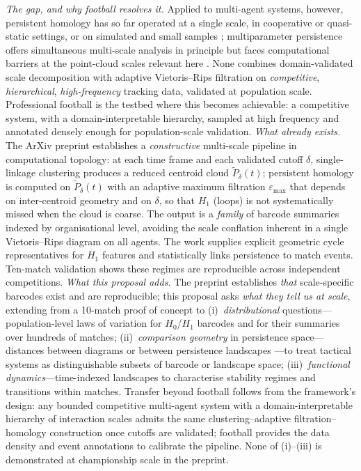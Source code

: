 \textit{The gap, and why football resolves it.} Applied to multi-agent systems, however, persistent homology has so far operated at a single scale, in cooperative or quasi-static settings, or on simulated and small samples \citep{Gu2022, SchindlerBarahona2023}; multiparameter persistence offers simultaneous multi-scale analysis in principle but faces computational barriers at the point-cloud scales relevant here \citep{BotnanLesnick2022}. None combines domain-validated scale decomposition with adaptive Vietoris--Rips filtration on \emph{competitive}, \emph{hierarchical}, \emph{high-frequency} tracking data, validated at population scale. Professional football is the testbed where this becomes achievable: a competitive system, with a domain-interpretable hierarchy, sampled at high frequency and annotated densely enough for population-scale validation.
\textit{What already exists.} The ArXiv preprint \citep{Brown2026} establishes a \emph{constructive} multi-scale pipeline in computational topology: at each time frame and each validated cutoff $\delta$, single-linkage clustering produces a reduced centroid cloud $\tilde P_\delta(t)$; persistent homology is computed on $\tilde P_\delta(t)$ with an adaptive maximum filtration $\varepsilon_{\max}$ that depends on inter-centroid geometry and on $\delta$, so that $H_1$ (loops) is not systematically missed when the cloud is coarse. The output is a \emph{family} of barcode summaries indexed by organisational level, avoiding the scale conflation inherent in a single Vietoris--Rips diagram on all agents. The work supplies explicit geometric cycle representatives for $H_1$ features and statistically links persistence to match events. Ten-match validation shows these regimes are reproducible across independent competitions.
\textit{What this proposal adds.} The preprint establishes \emph{that} scale-specific barcodes exist and are reproducible; this proposal asks \emph{what they tell us at scale}, extending from a 10-match proof of concept to (i)~\emph{distributional} questions---population-level laws of variation for $H_0$/$H_1$ barcodes and for their summaries over hundreds of matches; (ii)~\emph{comparison geometry} in persistence space---distances between diagrams or between persistence landscapes \citep{Bubenik2015, Chazal2014}---to treat tactical systems as distinguishable subsets of barcode or landscape space; (iii)~\emph{functional dynamics}---time-indexed landscapes to characterise stability regimes and transitions within matches. Transfer beyond football follows from the framework's design: any bounded competitive multi-agent system with a domain-interpretable hierarchy of interaction scales admits the same clustering--adaptive filtration--homology construction once cutoffs are validated; football provides the data density and event annotations to calibrate the pipeline. None of (i)--(iii) is demonstrated at championship scale in the preprint.

